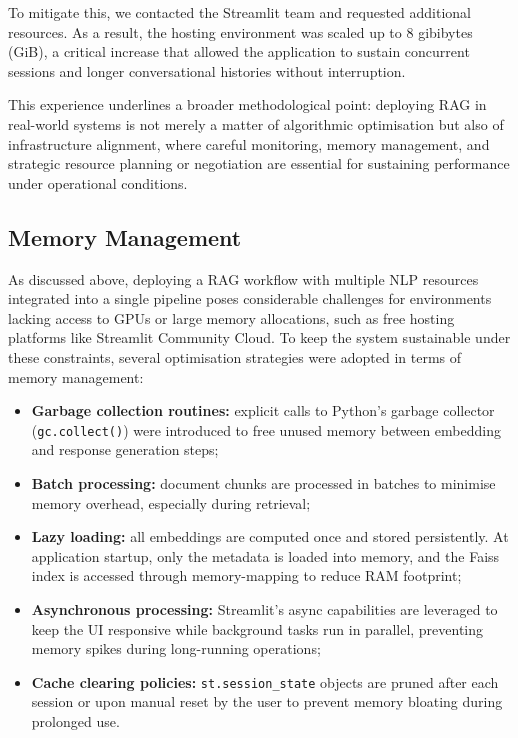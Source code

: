 \begin{spacing}{1.5}
To mitigate this, we contacted the Streamlit team and requested additional resources. As a result, the hosting environment was scaled up to 8 gibibytes (GiB), a critical increase that allowed the application to sustain concurrent sessions and longer conversational histories without interruption. 

This experience underlines a broader methodological point: deploying RAG in real-world systems is not merely a matter of algorithmic optimisation but also of infrastructure alignment, where careful monitoring, memory management, and strategic resource planning or negotiation are essential for sustaining performance under operational conditions.

\subsection{Memory Management}
As discussed above, deploying a RAG workflow with multiple NLP resources integrated into a single pipeline poses considerable challenges for environments lacking access to GPUs or large memory allocations, such as free hosting platforms like Streamlit Community Cloud. To keep the system sustainable under these constraints, several optimisation strategies were adopted in terms of memory management:
\begin{itemize}
\item \textbf{Garbage collection routines:} explicit calls to Python's garbage collector (\texttt{gc.collect()}) were introduced to free unused memory between embedding and response generation steps;
\item \textbf{Batch processing:} document chunks are processed in batches to minimise memory overhead, especially during retrieval;
\item \textbf{Lazy loading:} all embeddings are computed once and stored persistently. At application startup, only the metadata is loaded into memory, and the Faiss index is accessed through memory-mapping to reduce RAM footprint;
\item \textbf{Asynchronous processing:} Streamlit's async capabilities are leveraged to keep the UI responsive while background tasks run in parallel, preventing memory spikes during long-running operations;
\item \textbf{Cache clearing policies:} \texttt{st.session\_state} objects are pruned after each session or upon manual reset by the user to prevent memory bloating during prolonged use.
\end{itemize}


\end{spacing}
